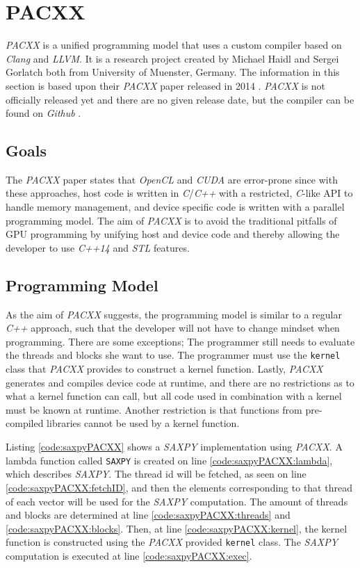 \section{PACXX}
\textit{PACXX} is a unified programming model that uses a custom compiler based on \textit{Clang} and \textit{LLVM}. It is a research project created by Michael Haidl and Sergei Gorlatch both from University of Muenster, Germany. The information in this section is based upon their \textit{PACXX} paper released in 2014 \cite{pacxxPaper}. \textit{PACXX} is not officially released yet and there are no given release date, but the compiler can be found on \textit{Github} \cite{pacxxGithub}.

\subsection{Goals}
The \textit{PACXX} paper states that \textit{OpenCL} and \textit{CUDA} are error-prone since with these approaches, host code is written in \textit{C}/\textit{C++} with a restricted, \textit{C}-like API to handle memory management, and device specific code is written with a parallel programming model. The aim of \textit{PACXX} is to avoid the traditional pitfalls of GPU programming by unifying host and device code and thereby allowing the developer to use \textit{C++14} and \textit{STL} features.

\subsection{Programming Model}
As the aim of \textit{PACXX} suggests, the programming model is similar to a regular \textit{C++} approach, such that the developer will not have to change mindset when programming. There are some exceptions; The programmer still needs to evaluate the threads and blocks she want to use. The programmer must use the \texttt{kernel} class that \textit{PACXX} provides to construct a kernel function. Lastly, \textit{PACXX} generates and compiles device code at runtime, and there are no restrictions as to what a kernel function can call, but all code used in combination with a kernel must be known at runtime. Another restriction is that functions from pre-compiled libraries cannot be used by a kernel function.

Listing \ref{code:saxpyPACXX} shows a \textit{SAXPY} implementation using \textit{PACXX}. A lambda function called \texttt{SAXPY} is created on line \ref{code:saxpyPACXX:lambda}, which describes \textit{SAXPY}. The thread id will be fetched, as seen on line \ref{code:saxpyPACXX:fetchID}, and then the elements corresponding to that thread of each vector will be used for the \textit{SAXPY} computation. The amount of threads and blocks are determined at line \ref{code:saxpyPACXX:threads} and \ref{code:saxpyPACXX:blocks}. Then, at line \ref{code:saxpyPACXX:kernel}, the kernel function is constructed using the \textit{PACXX} provided \texttt{kernel} class. The \textit{SAXPY} computation is executed at line \ref{code:saxpyPACXX:exec}.

